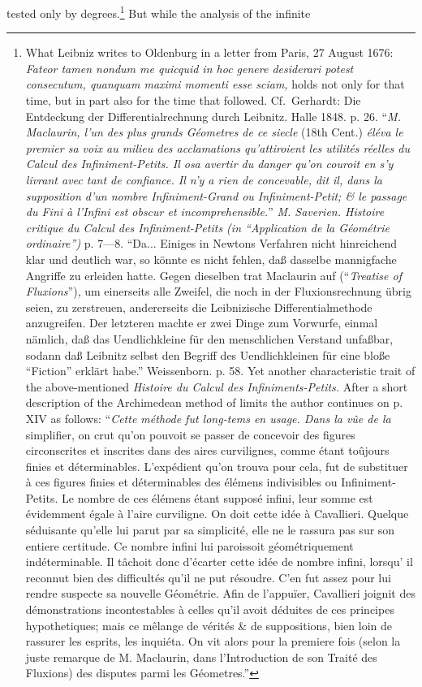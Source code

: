 \documentclass[12pt,a4paper,openany]{book}
\begin{document}
tested only by degrees.\footnote[2]{What Leibniz writes to Oldenburg in a letter from Paris, 27 August 1676: \textit{Fateor tamen nondum me quicquid in hoc genere desiderari potest consecutum, quanquam maximi momenti esse sciam,} holds not only for that time, but in part also for the time that followed. Cf.\ Gerhardt: Die Entdeckung der Differentialrechnung durch Leibnitz. Halle 1848. p. 26. ``\textit{M. Maclaurin, l'un des plus grands Géometres de ce siecle} (18th Cent.) \textit{éléva le premier sa voix au milieu des acclamations qu'attiroient les utilités réelles du Calcul des Infiniment-Petits. Il osa avertir du danger qu'on couroit en s'y livrant avec tant de confiance. Il n'y a rien de concevable, dit il, dans la supposition d'un nombre Infiniment-Grand ou Infiniment-Petit; \& le passage du Fini à l'Infini est obscur et incomprehensible.}'' \textit{M. Saverien. Histoire critique du Calcul des Infiniment-Petits (in ``Application de la Géométrie ordinaire'')} p. 7—8. ``Da... Einiges in Newtons Verfahren nicht hinreichend klar und deutlich war, so könnte es nicht fehlen, daß dasselbe mannigfache Angriffe zu erleiden hatte. Gegen dieselben trat Maclaurin auf (``\textit{Treatise of Fluxions}''), um einerseits alle Zweifel, die noch in der Fluxionsrechnung übrig seien, zu zerstreuen, andererseits die Leibnizische Differentialmethode anzugreifen. Der letzteren machte er zwei Dinge zum Vorwurfe, einmal nämlich, daß das Uendlichkleine für den menschlichen Verstand unfaßbar, sodann daß Leibnitz selbst den Begriff des Uendlichkleinen für eine bloße ``Fiction'' erklärt habe.'' Weissenborn. p. 58. Yet another characteristic trait of the above-mentioned \textit{Histoire du Calcul des Infiniments-Petits.} After a short description of the Archimedean method of limits the author continues on p. XIV as follows: ``\textit{Cette méthode fut long-tems en usage. Dans la vûe de la} simplifier, on crut qu'on pouvoit se passer de concevoir des figures circonscrites et inscrites dans des aires curvilignes, comme étant toûjours finies et déterminables. L'expédient qu'on trouva pour cela, fut de substituer à ces figures finies et déterminables des élémens indivisibles ou Infiniment-Petits. Le nombre de ces élémens étant supposé infini, leur somme est évidemment égale à l'aire curviligne. On doit cette idée à Cavallieri. Quelque séduisante qu'elle lui parut par sa simplicité, elle ne le rassura pas sur son entiere certitude. Ce nombre infini lui paroissoit géométriquement indéterminable. Il tâchoit donc d'écarter cette idée de nombre infini, lorsqu' il reconnut bien des difficultés qu'il ne put résoudre. C'en fut assez pour lui rendre suspecte sa nouvelle Géométrie. Afin de l'appuïer, Cavallieri joignit des démonstrations incontestables à celles qu'il avoit déduites de ces principes hypothetiques; mais ce mêlange de vérités \& de suppositions, bien loin de rassurer les esprits, les inquiéta. On vit alors pour la premiere fois (selon la juste remarque de M. Maclaurin, dans l'Introduction de son Traité des Fluxions) des disputes parmi les Géometres.''} But while the analysis of the infinite %
\end{document}

